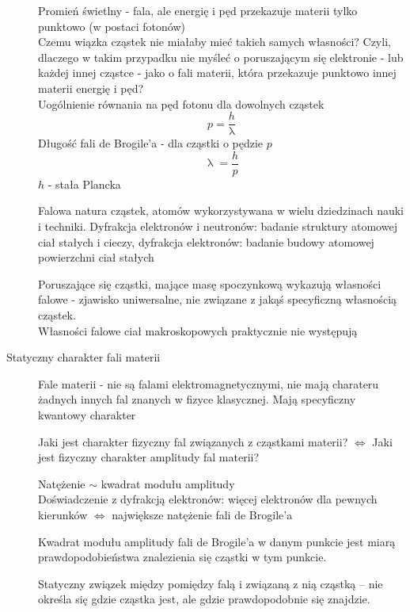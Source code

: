 \documentclass[a4paper,11pt]{article}
\begin{document}
\begin{description}
  Promień świetlny - fala, ale energię i pęd przekazuje materii tylko punktowo (w postaci fotonów)\\
  Czemu wiązka cząstek nie miałaby mieć takich samych własności? Czyli, dlaczego w takim przypadku nie myśleć o poruszającym się elektronie - lub każdej innej cząstce - jako o fali materii, która przekazuje punktowo innej materii energię i pęd?\\
  Uogólnienie równania na pęd fotonu dla dowolnych cząstek
  $$p=\frac{h}{\uplambda}$$
  Długość fali de Brogile'a - dla cząstki o pędzie $p$
  $$\uplambda=\frac{h}{p}$$
  $h$ - stała Plancka

  Falowa natura cząstek, atomów wykorzystywana w wielu dziedzinach nauki i techniki. Dyfrakcja elektronów i neutronów: badanie struktury atomowej ciał stałych i cieczy, dyfrakcja elektronów: badanie budowy atomowej powierzchni ciał stałych

  Poruszające się cząstki, mające masę spoczynkową wykazują własności falowe - zjawisko uniwersalne, nie związane z jakąś specyficzną własnością cząstek.\\
  Własności falowe ciał makroskopowych praktycznie nie występują
\item[Statyczny charakter fali materii] Fale materii - nie są falami elektromagnetycznymi, nie mają charateru żadnych innych fal znanych w fizyce klasycznej. Mają specyficzny kwantowy charakter

  Jaki jest charakter fizyczny fal związanych z cząstkami materii? $\Leftrightarrow$ Jaki jest fizyczny charakter amplitudy fal materii?

  Natężenie $\sim$ kwadrat modułu amplitudy\\
  Doświadczenie z dyfrakcją elektronów: więcej elektronów dla pewnych kierunków $\Leftrightarrow$ największe natężenie fali de Brogile'a

  Kwadrat modułu amplitudy fali de Brogile'a w danym punkcie jest miarą prawdopodobieństwa znalezienia się cząstki w tym punkcie.

  Statyczny związek między pomiędzy falą i związaną z nią cząstką -- nie określa się gdzie cząstka jest, ale gdzie prawdopodobnie się znajdzie.


\end{description}
\end{document}
